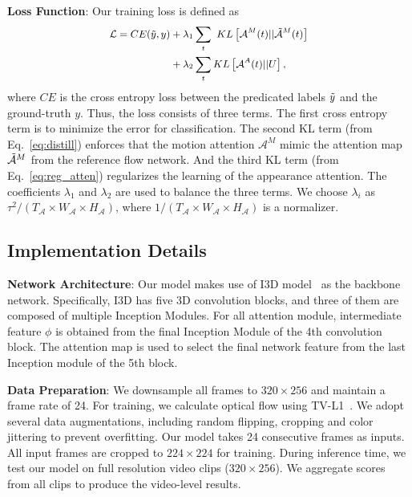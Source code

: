 \documentclass[10pt,twocolumn,letterpaper]{article}
\begin{document}
\noindent \textbf{Loss Function}: Our training loss is defined as
\begin{equation}
\small
\begin{split}
    \mathcal{L} = CE(\Tilde{y}, y) &+ \lambda_1 \sum_t\  KL\left[ \mathcal{A}^M(t)||\mathcal{\Tilde{A}}^M(t) \right] \\
                  & + \lambda_2 \sum_t KL\left[ \mathcal{A}^A(t)||U \right],
\end{split}
\end{equation}
where $CE$ is the cross entropy loss between the predicated labels $\Tilde{y}$ and the ground-truth $y$. Thus, the loss consists of three terms. The first cross entropy term is to minimize the error for classification. The second KL term (from Eq.\ \ref{eq:distill}) enforces that the motion attention $\mathcal{A}^M$ mimic the attention map $\mathcal{\Tilde{A}}^M$ from the reference flow network. And the third KL term (from Eq.\ \ref{eq:reg_atten}) regularizes the learning of the appearance attention. The coefficients $\lambda_1$ and $\lambda_2$ are used to balance the three terms. We choose $\lambda_{i}$ as $\tau^2/ (T_\mathcal{A}\times W_\mathcal{A}\times H_\mathcal{A})$, where $1/ (T_\mathcal{A}\times W_\mathcal{A}\times H_\mathcal{A})$ is a normalizer. 


\subsection{Implementation Details}
\noindent \textbf{Network Architecture}: 
Our model makes use of I3D model~\cite{carreira2017quo} as the backbone network. Specifically, I3D has five 3D convolution blocks, and three of them are composed of multiple Inception Modules. For all attention module, intermediate feature $\phi$ is obtained from the final Inception Module of the 4th convolution block. The attention map is used to select the final network feature from the last Inception module of the 5th block.

\noindent \textbf{Data Preparation}:
We downsample all frames to $320\times256$ and maintain a frame rate of 24. For training, we calculate optical flow using TV-L1~\cite{perez2013tv}. We adopt several data augmentations, including random flipping, cropping and color jittering to prevent overfitting. Our model takes 24 consecutive frames as inputs. All input frames are cropped to $224\times224$ for training. During inference time, we test our model on full resolution video clips ($320\times256$). We aggregate scores from all clips to produce the video-level results.
\end{document}
